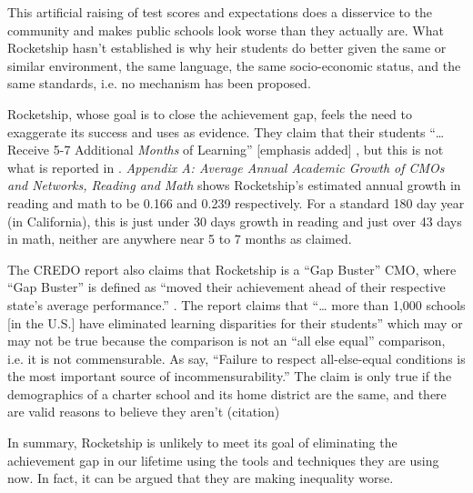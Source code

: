 This artificial raising of test scores and expectations does a disservice to the community and makes public schools look worse than they actually are. What Rocketship hasn't established is why heir students do better given the same or similar environment, the same language, the same socio-economic status, and the same standards, i.e. no mechanism has been proposed.

Rocketship, whose goal is to close the achievement gap, feels the need to exaggerate its success and uses \textcite{Raymond.etal2023} as evidence. They claim that their students ``\ldots{} Receive 5-7 Additional \textit{Months} of Learning'' [emphasis added] \parencite{RSED2023}, but this is not what is reported in \textcite{Raymond.etal2023}. \textit{Appendix A: Average Annual Academic Growth of CMOs and Networks, Reading and Math} \textcite[132]{Raymond.etal2023} shows Rocketship's estimated annual growth in reading and math to be 0.166 and 0.239 respectively. For a standard 180 day year (in California), this is just under 30 days growth in reading and just over 43 days in math, neither are anywhere near 5 to 7 months as claimed.

The CREDO report also claims that Rocketship is a ``Gap Buster'' CMO, where ``Gap Buster'' is defined as ``moved their achievement ahead of their respective state’s average performance.'' \parencite[14]{Raymond.etal2023}. The report claims that ``\ldots{} more than 1,000 schools [in the U.S.] have eliminated learning disparities for their students'' \parencite[14]{Raymond.etal2023} which may or may not be true because the comparison is not an ``all else equal'' comparison, i.e. it is not commensurable. As \textcite[16]{Ashworth.etal2021} say, ``Failure to respect all-else-equal conditions is the most important source of incommensurability.'' The claim is only true if the demographics of a charter school and its home district are the same, and there are valid reasons to believe they aren't (citation)

In summary, Rocketship is unlikely to meet its goal of eliminating the achievement gap in our lifetime using the tools and techniques they are using now. In fact, it can be argued that they are making inequality worse.

